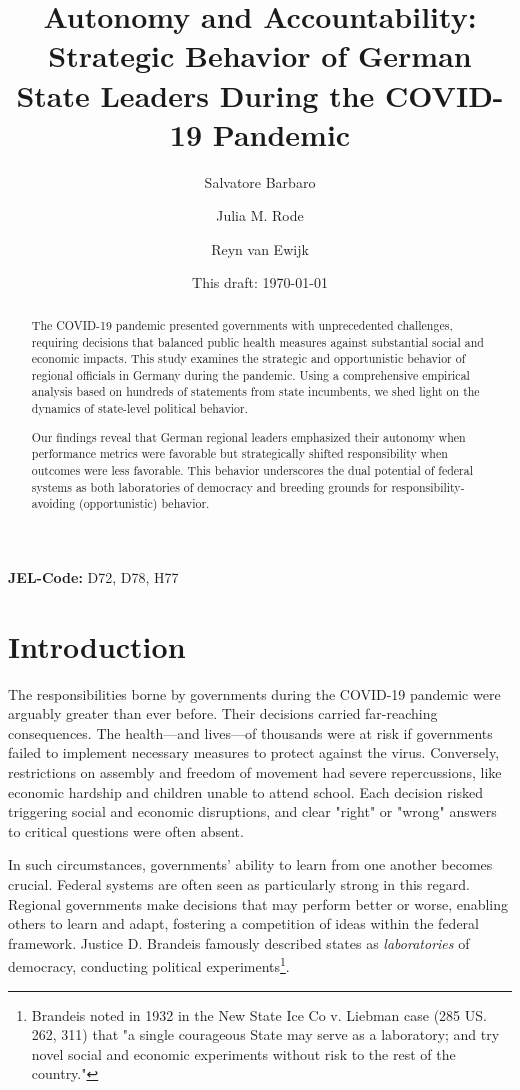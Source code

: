 \documentclass[12pt, abstract=true]{scrartcl}
\title{Autonomy and Accountability: Strategic Behavior of German State Leaders During the COVID-19 Pandemic}
\author[$\star$]{Salvatore Barbaro}
\author[$\mp$]{Julia M. Rode}
\author[$ \dag$]{Reyn van Ewijk}
\affil[$\star$,$\dag$]{Johannes-Gutenberg University, Gutenberg School of Management and Economics and Interdisciplinary Public Policy \\ 55122 Mainz, Germany \href{mailto:sbarbaro@uni-mainz.de}{sbarbaro@uni-mainz.de}}
\affil[$\mp$]{Deutsche Bundesbank, 60431 Frankfurt (HE), Germany}
\date{This draft: \today}
\begin{document}
\maketitle

\begin{abstract}
The COVID-19 pandemic presented governments with unprecedented challenges, requiring decisions that balanced public health measures against substantial social and economic impacts. This study examines the strategic and opportunistic behavior of regional officials in Germany during the pandemic. Using a comprehensive empirical analysis based on hundreds of statements from state incumbents, we shed light on the dynamics of state-level political behavior.

Our findings reveal that German regional leaders emphasized their autonomy when performance metrics were favorable but strategically shifted responsibility when outcomes were less favorable. This behavior underscores the dual potential of federal systems as both laboratories of democracy and breeding grounds for responsibility-avoiding (opportunistic) behavior.
\end{abstract}

\textbf{JEL-Code:} D72, D78,  H77
\linenumbers
\newpage
\section[Introduction]{Introduction}\label{sec.introduction}
The responsibilities borne by governments during the COVID-19 pandemic were arguably greater than ever before. Their decisions carried far-reaching consequences. The health—and lives—of thousands were at risk if governments failed to implement necessary measures to protect against the virus. Conversely, restrictions on assembly and freedom of movement had severe repercussions, like  economic hardship and children unable to attend school. Each decision risked triggering social and economic disruptions, and clear "right" or "wrong" answers to critical questions were often absent.

In such circumstances, governments' ability to learn from one another becomes crucial. Federal systems are often seen as particularly strong in this regard. Regional governments make decisions that may perform better or worse, enabling others to learn and adapt, fostering a competition of ideas within the federal framework. Justice D. Brandeis famously described states as \textit{laboratories} of democracy, conducting political experiments\footnote{Brandeis noted in 1932 in the New State Ice Co v. Liebman case (285 US. 262, 311) that "a single courageous State may serve as a laboratory; and try novel social and economic experiments without risk to the rest of the country."}.
\end{document}
